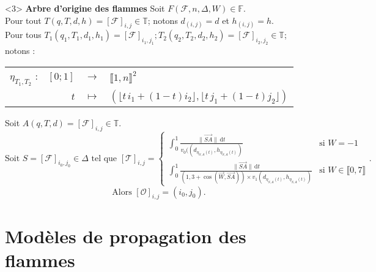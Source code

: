 \documentclass{beamer}
\begin{document}
{    \begin{onlyenv}<3>
      \textbf{Arbre d'origine des flammes}
      \bigbreak
      Soit \(F(\mathcal{F},n,\Delta,W) \in \mathbb{F}\).\\
      {\small Pour tout \(T(q,T,d,h) = [\mathcal{F}]_{i,j} \in \mathbb{T}\); notons \(d_{(i,j)} = d\) et \(h_{(i,j)} = h\).}\\
      {\scriptsize Pour tous \(T_{1}(q_{1},T_{1},d_{1},h_{1}) = [\mathcal{F}]_{i_{1},j_{1}}; T_{2}(q_{2},T_{2},d_{2},h_{2}) = [\mathcal{F}]_{i_{2},j_{2}} \in \mathbb{T}\); notons :} \begin{center}\begin{tabular}{c | r c l}
        \(\eta_{T_{1},T_{2}}\) : & \([0;1]\) & \(\to\) & \(\llbracket 1,n \rrbracket ^{2}\)\\
        & \(t\) & \(\mapsto\) & \((\lfloor t\,i_{1}+(1-t)i_{2} \rfloor,\lfloor t\,j_{1}+(1-t)j_{2} \rfloor)\)
      \end{tabular}\end{center}
      Soit \(A(q,T,d) = [\mathcal{F}]_{i,j} \in \mathbb{T}\).
      {\tiny\[
        \text{Soit } S = [\mathcal{F}]_{i_{0},j_{0}} \in \Delta \text{ tel que } [\mathcal{T}]_{i,j} =\begin{cases}
          \displaystyle\int_{0}^{1} \frac{\|\overrightarrow{SA}\|\,\mathrm{d}t}{v_{0}((d_{\eta_{S,A}(t)},h_{\eta_{S,A}(t)})} & \text{si } W = -1\\
          \displaystyle\int_{0}^{1} \frac{\|\overrightarrow{SA}\|\,\mathrm{d}t}{(1,3 + \cos(\overrightarrow{W},\overrightarrow{SA})) \times v_{1}(d_{\eta_{S,A}(t)},h_{\eta_{S,A}(t)})} & \text{si } W \in \llbracket 0,7 \rrbracket
        \end{cases}\text{.}
      \]}\[
        \text{Alors } \boxed{[\mathcal{O}]_{i,j} = (i_{0},j_{0})} \text{.}
      \]
    \end{onlyenv}
  }
  \section[Modèles]{Modèles de propagation des flammes}
\end{document}
